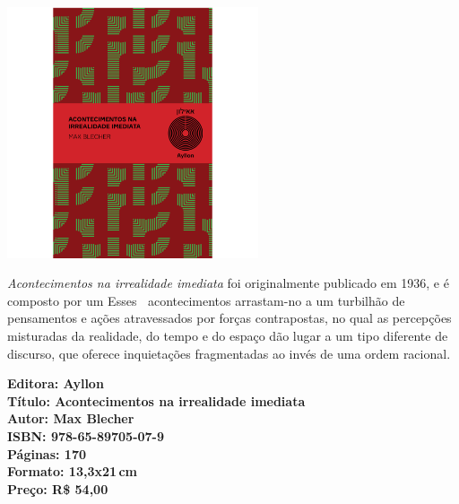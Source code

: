 \begin{center}
\hspace*{.5cm}\includegraphics[width=74mm]{./CAPAS/AYLLON_BLECHER.jpg}
\end{center}
\hspace*{-7cm}\hrulefill\hspace*{-7cm}
\medskip

\noindent{}\textit{Acontecimentos na irrealidade imediata} foi originalmente publicado em 1936, e é composto por um  Esses􏰃􏰀 acontecimentos arrastam-no a um turbilhão de pensamentos e ações atravessados por forças contrapostas, no qual as percepções misturadas da realidade, do tempo e do espaço dão lugar a um tipo diferente de discurso, que oferece inquietações fragmentadas ao invés de uma ordem racional.

\vfill
\noindent\begin{minipage}[c]{1\linewidth}
{\small\textbf{
\hspace*{-.1cm}Editora: Ayllon\\
Título: Acontecimentos na irrealidade imediata\\
Autor: Max Blecher\\ 
ISBN: 978-65-89705-07-9\\
Páginas: 170\\
Formato: 13,3x21\,cm\\
Preço: R\$ 54,00\\
}}
\end{minipage}
\pagebreak

